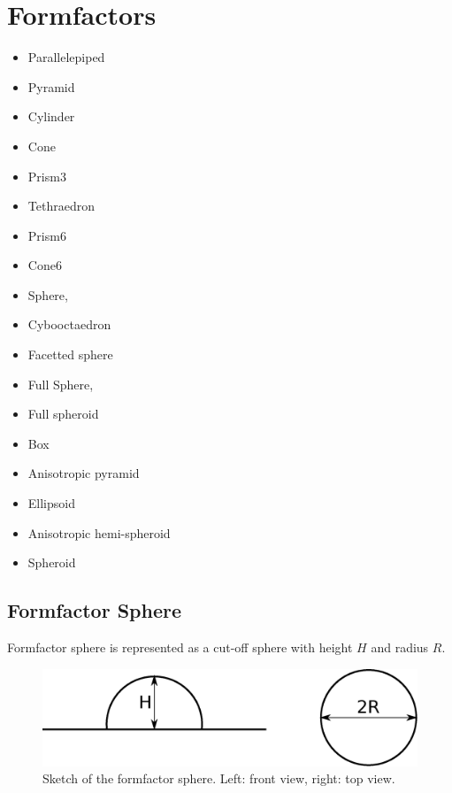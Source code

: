 \chapter{Formfactors}

\begin{itemize}
\item Parallelepiped
\item Pyramid
\item Cylinder
\item Cone
\item Prism3
\item Tethraedron
\item Prism6
\item Cone6
\item Sphere,  
\item Cybooctaedron
\item Facetted sphere  
\item Full Sphere,  
\item Full spheroid 
\item Box
\item Anisotropic pyramid
\item Ellipsoid
\item Anisotropic hemi-spheroid
\item Spheroid
\end{itemize}

\newpage
\section{Formfactor Sphere}
Formfactor sphere is represented as a cut-off sphere with height $H$ and radius $R$. 
\begin{figure}[ht]
\begin{center}
\includegraphics[width=0.6\columnwidth]{Figures/sphere}
\caption{Sketch of the formfactor sphere. Left: front view, right: top view.}
\end{center}
\label{sphere}
\end{figure}

